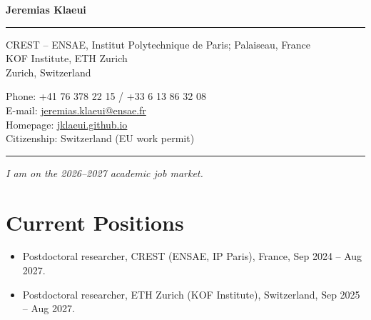 \documentclass[11pt]{article}
\begin{document}
\thispagestyle{firstpage}

{\Huge\bfseries Jeremias Klaeui}

\vspace{2mm}
\rule{\textwidth}{0.8pt}
\vspace{1mm}

\begin{minipage}[t]{0.48\textwidth}
CREST -- ENSAE, Institut Polytechnique de Paris; 
Palaiseau, France\\[2pt]
KOF Institute, ETH Zurich\\
Zurich, Switzerland
\end{minipage}\hfill
\begin{minipage}[t]{0.48\textwidth}
Phone: +41 76 378 22 15 / +33 6 13 86 32 08\\
E-mail: \href{mailto:jeremias.klaeui@ensae.fr}{jeremias.klaeui@ensae.fr}\\
Homepage: \href{https://jklaeui.github.io/}{jklaeui.github.io}\\
Citizenship: Switzerland (EU work permit)
\end{minipage}

\vspace{2mm}
\rule{\textwidth}{0.8pt}

\begin{center}
\textit{I am on the 2026--2027 academic job market.}
\end{center}

\section{Current Positions}
\begin{itemize}
\item Postdoctoral researcher, CREST (ENSAE, IP Paris), France, Sep 2024 -- Aug 2027.
\item Postdoctoral researcher, ETH Zurich (KOF Institute), Switzerland, Sep 2025 -- Aug 2027.
\end{itemize}

\end{document}
